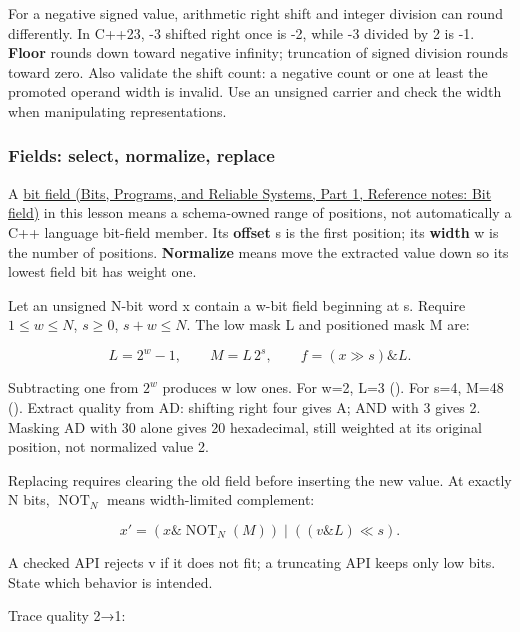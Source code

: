 For a negative signed value, arithmetic right shift and integer division can round differently. In C++23, -3 shifted right once is -2, while -3 divided by 2 is -1. \textbf{Floor} rounds down toward negative infinity; truncation of signed division rounds toward zero. Also validate the shift count: a negative count or one at least the promoted operand width is invalid. Use an unsigned carrier and check the width when manipulating representations.

\subsubsection{Fields: select, normalize, replace}\label{05-engine-i-ch001-fields-select-normalize-replace}

\hypertarget{05-engine-i-ch001-fields-select-normalize-replace}{}

A \href{../01-Bits-Programs-and-Reliable-Systems-P01/main.pdf\#appendix-ac697f5c66e8}{bit field (Bits, Programs, and Reliable Systems, Part 1, Reference notes: Bit field)} in this lesson means a schema-owned range of positions, not automatically a C++ language bit-field member. Its \textbf{offset} s is the first position; its \textbf{width} w is the number of positions. \textbf{Normalize} means move the extracted value down so its lowest field bit has weight one.

Let an unsigned N-bit word x contain a w-bit field beginning at s. Require \(1\le w\le N\), \(s\ge0\), \(s+w\le N\). The low mask L and positioned mask M are:

\[
L=2^w-1,\qquad M=L\,2^s,\qquad f=(x\gg s)\mathbin{\&}L.
\]

Subtracting one from \(2^w\) produces w low ones. For w=2, L=3 (). For s=4, M=48 (). Extract quality from AD: shifting right four gives A; AND with 3 gives 2. Masking AD with 30 alone gives 20 hexadecimal, still weighted at its original position, not normalized value 2.

Replacing requires clearing the old field before inserting the new value. At exactly N bits, \(\operatorname{NOT}_N\) means width-limited complement:

\[
x'=(x\mathbin{\&}\operatorname{NOT}_N(M))
\mathbin{|}((v\mathbin{\&}L)\ll s).
\]

A checked API rejects v if it does not fit; a truncating API keeps only low bits. State which behavior is intended.

Trace quality 2→1:

